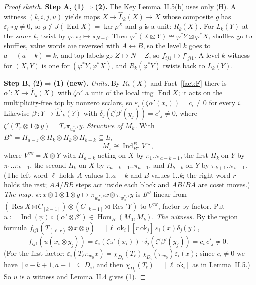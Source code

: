 \documentclass[11pt]{amsart}
\newcommand{\Hom}{\operatorname{Hom}}
\newcommand{\End}{\operatorname{End}}
\newcommand{\Ind}{\operatorname{Ind}}
\newcommand{\Res}{\operatorname{Res}}
\newcommand{\sq}{\boxtimes}
\newcommand{\ok}{\mathrm{ok}}
\newcommand{\Lh}{\widehat L}
\theoremstyle{plain}
\theoremstyle{definition}
\begin{document}
\begin{proof}[Proof sketch]
\textbf{Step A, (1)$\Rightarrow$(2).} The Key Lemma~II.5(b) uses only (H). A witness $(k,i,j,u)$ yields maps $X\to\Lh_k(X)\to X$ whose composite $g$ has $\varepsilon_i\circ g\ne0$, so $g\notin J(\End X)=\ker\rho^X$ and $g$ is a unit: $R_k(X)$. For $L_k(Y)$ at the \emph{same} $k$, twist by $\varphi:\pi_i\mapsto\pi_{N-i}$. Then $\varphi^*(X\sq Y)\cong\varphi^*Y\sq\varphi^*X$; shuffles go to shuffles, value words are reversed with $A\leftrightarrow B$, so the level $k$ goes to $a-(a-k)=k$, and top labels go $Z\mapsto N-Z$, so $f_{ij1}\mapsto f'_{ji1}$. A level-$k$ witness for $(X,Y)$ is one for $(\varphi^*Y,\varphi^*X)$, and $R_k(\varphi^*Y)$ twists back to $L_k(Y)$.

\textbf{Step B, (2)$\Rightarrow$(1) (new).}
\emph{Units.} By $R_k(X)$ and Fact~\ref{fact:F} there is $\alpha':X\to\Lh_k(X)$ with $\zeta\alpha'$ a unit of the local ring $\End X$; it acts on the multiplicity-free top by nonzero scalars, so $\varepsilon_i(\zeta\alpha'(x_i))=c_i\ne0$ for every $i$. Likewise $\beta':Y\to\Lh'_k(Y)$ with $\delta_j(\zeta'\beta'(y_j))=c'_j\ne0$, where $\zeta'(T_r\otimes1\otimes y)=T_r\pi_{w_0^{Y,k}}y$.
\emph{Structure of $M_k$.} With $B''=H_{a-k}\otimes H_k\otimes H_k\otimes H_{b-k}\subseteq B$,
\[
M_k\cong\Ind_{B''}^{B}V^{\mathrm{tw}},
\]
where $V^{\mathrm{tw}}=X\otimes Y$ with $H_{a-k}$ acting on $X$ by $\pi_1..\pi_{a-k-1}$, the first $H_k$ on $Y$ by $\pi_1..\pi_{k-1}$, the second $H_k$ on $X$ by $\pi_{a-k+1}..\pi_{a-1}$, and $H_{b-k}$ on $Y$ by $\pi_{k+1}..\pi_{b-1}$. (The left word $\ell$ holds $A$-values $1..a-k$ and $B$-values $1..k$; the right word $r$ holds the rest; $AA$/$BB$ steps act inside each block and $AB$/$BA$ are coset moves.)
\emph{The map.} $\psi:x\otimes1\otimes1\otimes y\mapsto\pi_{w_0^{X,k}}x\otimes\pi_{w_0^{Y,k}}y$ is $B''$-linear from $(\Res X\sq C_{[k-1]})\otimes(C_{[k-1]}\sq\Res'Y)$ to $V^{\mathrm{tw}}$, factor by factor. Put $u:=\Ind(\psi)\circ(\alpha'\otimes\beta')\in\Hom_B(M_0,M_k)$.
\emph{The witness.} By the region formula $f_{ij1}(T_{(\ell|r)}\otimes x\otimes y)=[\ell\ \ok_i][r\ \ok_j]\,\varepsilon_i(x)\delta_j(y)$,
\[
f_{ij1}(u(x_i\otimes y_j))=\varepsilon_i(\zeta\alpha'(x_i))\cdot\delta_j(\zeta'\beta'(y_j))=c_i\,c'_j\ne0 .
\]
(For the first factor: $\varepsilon_i(T_\ell\pi_{w_0}x)=\chi_{D_i}(T_\ell)\chi_{D_i}(\pi_{w_0})\varepsilon_i(x)$; since $c_i\neq 0$ we have $[a-k+1,a-1]\subseteq D_i$, and then $\chi_{D_i}(T_\ell)=[\ell\ \ok_i]$ as in Lemma~II.5.) So $u$ is a witness and Lemma~II.4 gives (1).


\end{proof}
\end{document}
